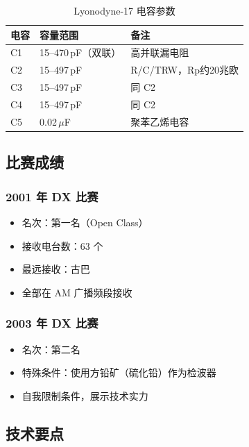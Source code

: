 \begin{table}[htbp]
    \centering
    \caption{Lyonodyne-17 电容参数}
    \label{tab:lyonodyne_capacitors}
    \begin{tabular}{lll}
        \toprule
        \textbf{电容} & \textbf{容量范围} & \textbf{备注} \\
        \midrule
        C1 & 15--470\,pF（双联） & 高并联漏电阻 \\
        C2 & 15--497\,pF & R/C/TRW，Rp约20兆欧 \\
        C3 & 15--497\,pF & 同 C2 \\
        C4 & 15--497\,pF & 同 C2 \\
        C5 & 0.02\,$\mu$F & 聚苯乙烯电容 \\
        \bottomrule
    \end{tabular}
\end{table}

\subsection{比赛成绩}
\label{subsec:lyonodyne_competition}

\subsubsection*{2001 年 DX 比赛}

\begin{itemize}[leftmargin=2cm]
    \item 名次：第一名（Open Class）
    \item 接收电台数：63 个
    \item 最远接收：古巴
    \item 全部在 AM 广播频段接收
\end{itemize}

\subsubsection*{2003 年 DX 比赛}

\begin{itemize}[leftmargin=2cm]
    \item 名次：第二名
    \item 特殊条件：使用方铅矿（硫化铅）作为检波器
    \item 自我限制条件，展示技术实力
\end{itemize}

\subsection{技术要点}
\label{subsec:lyonodyne_technical_points}

